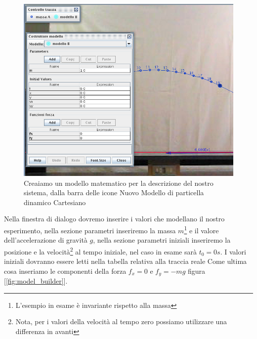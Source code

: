 \documentclass[a4paper,10pt,oneside]{article}
\begin{document}
\begin{figure}[H]
 \centering
 \includegraphics[width=\textwidth]{./immagini/tracker_nuovo_modello_particella_dinamico.png}
 \caption{Creaiamo un modello matematico per la descrizione del nostro sistema, dalla barra delle icone Nuovo \RIGHTarrow Modello di particella dinamico \RIGHTarrow Cartesiano}
 \label{fig:particella_dinamica}
\end{figure}

Nella finestra di dialogo dovremo inserire i valori che modellano il nostro esperimento, nella sezione parametri inseriremo la massa $m$\footnote{L'esempio in esame è invariante rispetto alla massa} e il valore dell'accelerazione di gravità $g$, nella sezione parametri iniziali inseriremo la posizione e la velocità\footnote{Nota, per i valori della velocità al tempo zero possiamo utilizzare una differenza in avanti} al tempo iniziale,  nel caso in esame sarà $t_0=0s$. I valori iniziali dovranno essere letti nella tabella relativa alla traccia reale
Come ultima cosa inseriamo le componenti della forza $f_x=0$ e $f_y=-mg$ figura [\ref{fig:model_builder}]. 
\end{document}
